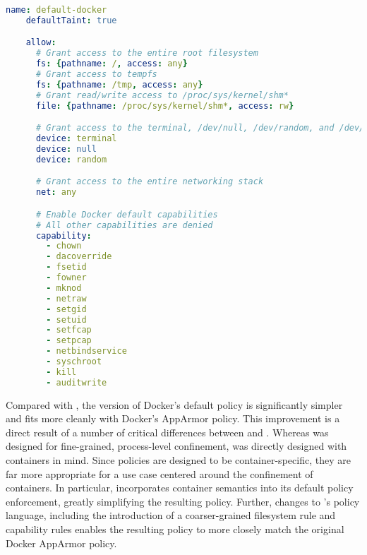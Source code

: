 \begin{lstlisting}[language=yaml, gobble=4,
  caption={[Implementing the default Docker policy in \bpfcontain{}]
    Implementing the default Docker policy in \bpfcontain{}.
    %A few coarse-grained
    %allow-rules can be used to capture permissive Docker defaults that are not covered
    %under \bpfcontain{}'s default policy. Other aspects of the Docker defaults are already
    %covered under \bpfcontain{} defaults, such as the inability to mount filesystems,
    %perform a number of privileged system calls, and interact with non-pid entries in
    %procfs and sysfs. Due to \bpfcontain{}'s default policy for file access and \gls{ipc},
    %it is neither necessary to specify file access rules for files within the container's
    %overlay filesystem nor \gls{ipc} rules for processes within the container.
  },
  label={lst:bpfcontain-docker-default}]
    name: default-docker
    defaultTaint: true

    allow:
      # Grant access to the entire root filesystem
      fs: {pathname: /, access: any}
      # Grant access to tempfs
      fs: {pathname: /tmp, access: any}
      # Grant read/write access to /proc/sys/kernel/shm*
      file: {pathname: /proc/sys/kernel/shm*, access: rw}

      # Grant access to the terminal, /dev/null, /dev/random, and /dev/urandom
      device: terminal
      device: null
      device: random

      # Grant access to the entire networking stack
      net: any

      # Enable Docker default capabilities
      # All other capabilities are denied
      capability:
        - chown
        - dacoverride
        - fsetid
        - fowner
        - mknod
        - netraw
        - setgid
        - setuid
        - setfcap
        - setpcap
        - netbindservice
        - syschroot
        - kill
        - auditwrite
\end{lstlisting}

Compared with \bpfbox{}, the \bpfcontain{} version of Docker's default policy is
significantly simpler and fits more cleanly with Docker's AppArmor policy. This
improvement is a direct result of a number of critical differences between \bpfbox{} and
\bpfcontain{}. Whereas \bpfbox{} was designed for fine-grained, process-level confinement,
\bpfcontain{} was directly designed with containers in mind. Since \bpfcontain{} policies
are designed to be container-specific, they are far more appropriate for a use case
centered around the confinement of containers. In particular, \bpfcontain{} incorporates
container semantics into its default policy enforcement, greatly simplifying the resulting
policy.  Further, changes to \bpfcontain{}'s policy language, including the introduction
of a coarser-grained filesystem rule and capability rules enables the resulting policy to
more closely match the original Docker AppArmor policy.

